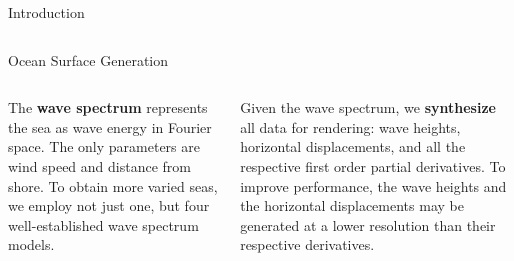 \documentclass[final,hyperref={pdfpagelabels=true}]{beamer}
\begin{document}
\begin{frame}
\begin{center}
\begin{minipage}{\textwidth}
\begin{block}{Introduction}
\begin{columns}[t]
\begin{column}{0.45\linewidth}
				\end{column}	  
			\end{columns}
		\end{block}
	\end{minipage}
	\begin{minipage}{\textwidth}
		\begin{block}{Ocean Surface Generation}	
			\begin{columns}[t]
				\begin{column}{0.45\linewidth}
					The \textbf{wave spectrum} represents the sea as wave energy in Fourier space.
					The only parameters are wind speed and distance from shore.
					To obtain more varied seas, we employ not just one, but four well-established
					wave spectrum models.
					\begin{figure}
					\centering
					\end{figure}
				\end{column}
				\begin{column}{0.45\linewidth}
					Given the wave spectrum, we \textbf{synthesize} all data for rendering:
					wave heights, horizontal displacements, and all the respective first order
					partial derivatives. To improve performance, the wave heights and the
					horizontal displacements may be generated at a lower resolution than
					their respective derivatives.
					\begin{figure}
					 \centering
					 \subfloat[Heights]

\end{figure}
\end{column}
\end{columns}
\end{block}
\end{minipage}
\end{center}
\end{frame}
\end{document}
